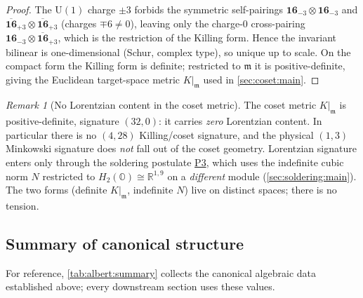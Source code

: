 \documentclass[11pt]{article}
\theoremstyle{plain}
\theoremstyle{definition}
\theoremstyle{remark}
\newtheorem{remark}[theorem]{Remark}
\begin{document}
\begin{proof}
The $\mathrm{U}(1)$ charge $\pm3$ forbids the symmetric self-pairings
$\mathbf{16}_{-3}\!\otimes\!\mathbf{16}_{-3}$ and
$\overline{\mathbf{16}}_{+3}\!\otimes\!\overline{\mathbf{16}}_{+3}$
(charges $\mp6\neq0$), leaving only the charge-$0$ cross-pairing
$\mathbf{16}_{-3}\!\otimes\!\overline{\mathbf{16}}_{+3}$, which is the
restriction of the Killing form. Hence the invariant bilinear is
one-dimensional (Schur, complex type), so unique up to scale. On the
compact form the Killing form is definite; restricted to $\mathfrak{m}$
it is positive-definite, giving the Euclidean target-space metric
$K|_{\mathfrak{m}}$ used in \autoref{sec:coset:main}.
\end{proof}

\begin{remark}[No Lorentzian content in the coset metric]\label{rmk:albert:nolorentz}
The coset metric $K|_{\mathfrak{m}}$ is positive-definite, signature
$(32,0)$: it carries \emph{zero} Lorentzian content. In particular there
is no $(4,28)$ Killing/coset signature, and the physical $(1,3)$ Minkowski
signature does \emph{not} fall out of the coset geometry. Lorentzian
signature enters only through the soldering postulate
\hyperref[post:soldering:P3]{P3}, which uses the indefinite cubic norm
$N$ restricted to $H_{2}(\mathbb{O})\cong\mathbb{R}^{1,9}$ on a
\emph{different} module (\autoref{sec:soldering:main}). The two forms
(definite $K|_{\mathfrak{m}}$, indefinite $N$) live on distinct spaces;
there is no tension.
\end{remark}

\subsection{Summary of canonical structure}
\label{sec:albert:summary}

For reference, \autoref{tab:albert:summary} collects the canonical
algebraic data established above; every downstream section uses these
values.
\end{document}
